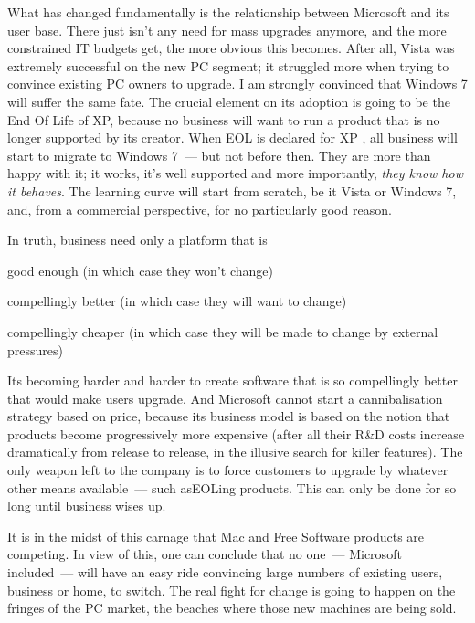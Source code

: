 \documentclass{book}
\begin{document}
What has changed fundamentally is the relationship between Microsoft
and its user base. There just isn't any need for mass upgrades
anymore, and the more constrained IT budgets get, the more obvious
this becomes. After all, Vista was extremely successful on the new PC
segment; it struggled more when trying to convince existing PC owners
to upgrade. I am strongly convinced that Windows 7 will suffer the
same fate. The crucial element on its adoption is going to be the End
Of Life of XP, because no business will want to run a product that is
no longer supported by its creator. When EOL is declared for XP , all
business will start to migrate to Windows 7~--- but not before
then. They are more than happy with it; it works, it's well supported
and more importantly, \emph{they know how it behaves}. The learning
curve will start from scratch, be it Vista or Windows 7, and, from a
commercial perspective, for no particularly good reason.

In truth, business need only a platform that is
\begin{inparaenum}
\item good enough (in which case they won't change)
\item compellingly better (in which case they will want to change)
\item compellingly cheaper (in which case they will be made to change
  by external pressures)
\end{inparaenum}

Its becoming harder and harder to create software that is so
compellingly better that would make users upgrade. And Microsoft
cannot start a cannibalisation strategy based on price, because its
business model is based on the notion that products become
progressively more expensive (after all their R\&D costs increase
dramatically from release to release, in the illusive search for
killer features). The only weapon left to the company is to force
customers to upgrade by whatever other means available~--- such asEOLing
products. This can only be done for so long until business wises up.

It is in the midst of this carnage that Mac and Free Software products
are competing. In view of this, one can conclude that no one~---
Microsoft included~--- will have an easy ride convincing large numbers
of existing users, business or home, to switch. The real fight for
change is going to happen on the fringes of the PC market, the beaches
where those new machines are being sold.
\end{document}
